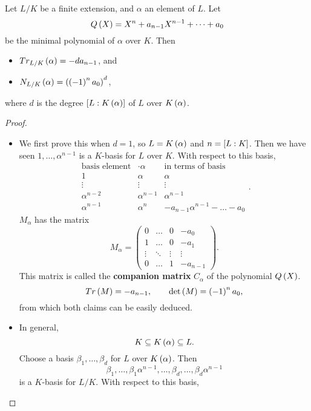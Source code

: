 
\begin{proposition}
\label{prop:12.2.2}
Let $ L / K $ be a finite extension, and $ \alpha $ an element of $ L $. Let
$$ Q\rb{X} = X^n + a_{n - 1}X^{n - 1} + \dots + a_0 $$
be the minimal polynomial of $ \alpha $ over $ K $. Then
\begin{itemize}
\item $ Tr_{L / K}\rb{\alpha} = -da_{n - 1} $, and
\item $ N_{L / K}\rb{\alpha} = \rb{\rb{-1}^na_0}^d $,
\end{itemize}
where $ d $ is the degree $ \sb{L : K\rb{\alpha}} $ of $ L $ over $ K\rb{\alpha} $.
\end{proposition}

\begin{proof}
\hfill
\begin{itemize}
\item We first prove this when $ d = 1 $, so $ L = K\rb{\alpha} $ and $ n = \sb{L : K} $. Then we have seen $ 1, \dots, \alpha^{n - 1} $ is a $ K $-basis for $ L $ over $ K $. With respect to this basis,
$$
\begin{array}{c|c|c}
\text{basis element} & \cdot \alpha & \text{in terms of basis} \\
\hline
1 & \alpha & \alpha \\
\vdots & \vdots & \vdots \\
\alpha^{n - 2} & \alpha^{n - 1} & \alpha^{n - 1} \\
\alpha^{n - 1} & \alpha^n & -a_{n - 1}\alpha^{n - 1} - \dots - a_0
\end{array}.
$$
$ M_\alpha $ has the matrix
$$ M_\alpha =
\begin{pmatrix}
0 & \dots & 0 & -a_0 \\
1 & \dots & 0 & -a_1 \\
\vdots & \ddots & \vdots & \vdots \\
0 & \dots & 1 & -a_{n - 1}
\end{pmatrix}.
$$
This matrix is called the \textbf{companion matrix} $ C_\alpha $ of the polynomial $ Q\rb{X} $.
$$ Tr\rb{M} = -a_{n - 1}, \qquad \det\rb{M} = \rb{-1}^na_0, $$
from which both claims can be easily deduced.
\item In general,
$$ K \subseteq K\rb{\alpha} \subseteq L. $$
Choose a basis $ \beta_1, \dots, \beta_d $ for $ L $ over $ K\rb{\alpha} $. Then
$$ \beta_1, \dots, \beta_1\alpha^{n - 1}, \dots, \beta_d, \dots, \beta_d\alpha^{n - 1} $$
is a $ K $-basis for $ L / K $. With respect to this basis,

\end{itemize}
\end{proof}
